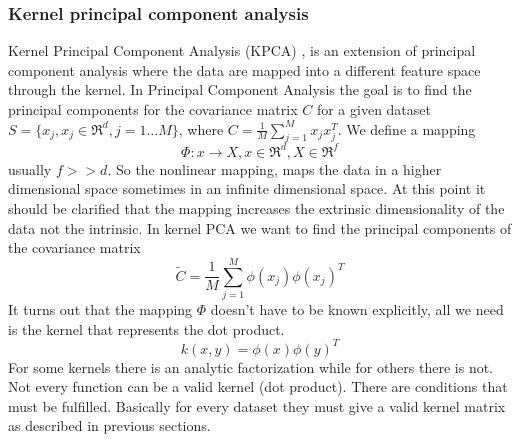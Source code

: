\documentclass[12pt,letterpaper,doublespaced,ETD,dvips,proposal]{gtthesis}
\begin{document}
\begin{Body}
\subsubsection{Kernel principal component analysis}
\label{Kernel_principal_component_analysis}

Kernel Principal Component Analysis (KPCA) \cite{scholkopf2002lks}, is an extension of
principal component analysis where the data are mapped into a
different feature space through the kernel. In Principal Component
Analysis the goal is to find the principal components for  the
covariance matrix $C$ for a given dataset $S=\{x_j, x_j\in \Re^d, j=1
\dots M\}$, where $C=\frac{1}{M}\sum_{j=1}^{M}x_j x_j^T$. We
define a mapping
\begin{equation}
\Phi : x \rightarrow X , x \in \Re^d, X\in \Re^f
\end{equation}
usually $f>>d$. So  the nonlinear mapping, maps the data in a
higher dimensional space sometimes in an infinite dimensional space.
At this point it should be clarified that the mapping increases the
extrinsic dimensionality of the data not the intrinsic. In kernel PCA we
want to find the principal components of the covariance matrix
\begin{equation}
\tilde{C} = \frac{1}{M}\sum_{j=1}^{M}\phi(x_j)\phi(x_j)^T
\end{equation}
It turns out that the mapping $\Phi$ doesn't have to be known
explicitly, all we need is the kernel that represents the dot
product.
\begin{equation}
k(x, y) = \phi(x)\phi(y)^T
\end{equation}
For some kernels there is an analytic factorization while for others
there is not. Not every function can be a valid kernel (dot
product). There are conditions that must be fulfilled. Basically for
every dataset they  must give a valid kernel matrix as described in
previous sections.


\end{Body}
\end{document}
